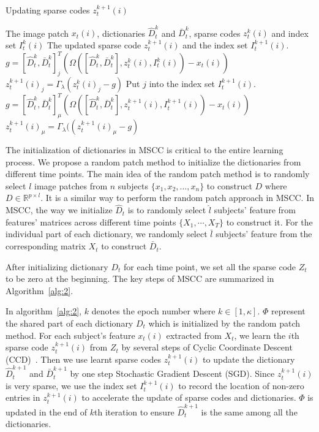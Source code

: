 \documentclass[10pt,twocolumn,letterpaper]{article}
\begin{document}
\begin{algorithm}[t]
\caption{Updating sparse codes $z_t^{k+1}(i)$}
\begin{algorithmic}[1]
   \Require The image patch $x_t(i)$, dictionaries $\hat{D}^k_t$ and $\bar{D}^k_t$, sparse codes $z_t^k(i)$ and index set $I_t^k(i)$
   \Ensure The updated sparse code $z_t^{k+1}(i)$ and the index set $I_t^{k+1}(i)$.
   \State\quad $g = [\hat{D}^k_t,\bar{D}^k_t]_j^T (  \Omega( [ \hat{D}^k_t, \bar{D}^k_t],  z_t^k(i), I_t^k(i) ) -x_t(i) ) $
   \State\quad $ z_t^{k+1}(i)_j=\Gamma_{\lambda }( z_t^k(i)_j-g) $
   \State\quad  Put $j$ into the index set $I_t^{k+1}(i)$.
   \EndIf
   \EndFor
   \State\quad $g = [\hat{D}^k_t,\bar{D}^k_t]_{\mu}^T( \Omega( [ \hat{D}^k_t, \bar{D}^k_t], z_t^{k+1}(i), I_t^{k+1}(i) )-x_t(i))$
   \State\quad $ z_t^{k+1}(i)_{\mu}=\Gamma_{\lambda }(( z_t^{k+1}(i)_{\mu}-g) $
   \EndFor
   \EndFor
\end{algorithmic}
\label{alg:3}
\end{algorithm}

The initialization of dictionaries in MSCC is critical to the entire learning process. We propose a random patch method to initialize the dictionaries from different time points. The main idea of the random patch method is to randomly select $l$ image patches from $n$ subjects $\{x_1, x_2, ..., x_n\}$ to construct $D$ where $D\in \mathbb{R}^{p\times l}$. It is a similar way to perform the random patch approach in MSCC. In MSCC, the way we initialize $\hat{D}_t$ is to randomly select $\hat{l}$ subjects' feature from features' matrices across different time points $\{X_1,\cdots,X_T\}$ to construct it. For the individual part of each dictionary, we randomly select $\bar{l}$ subjects' feature from the corresponding matrix $X_t$ to construct $\bar{D}_t$.

After initializing dictionary $D_t$ for each time point, we set all the sparse code $Z_t$ to be zero at the beginning. The key steps of MSCC are summarized in Algorithm~\ref{alg:2}.

In algorithm~\ref{alg:2}, $k$ denotes the epoch number where $k\in[1,\kappa]$. $\Phi$ represent the shared part of each dictionary $D_t$ which is initialized by the random patch method. For each subject's feature $x_t(i)$ extracted from $X_t$, we learn the $i$th sparse code  $z_t^{k+1}(i)$ from $Z_t$ by several steps of Cyclic Coordinate Descent (CCD)~\cite{canutescu2003cyclic}. Then we use learnt sparse codes $z_t^{k+1}(i)$ to update the dictionary $\hat{D}^{k+1}_t$ and $\bar{D}^{k+1}_t$ by one step Stochastic Gradient Descent (SGD)\cite{zhang2004solving}. Since $z_t^{k+1}(i)$ is very sparse, we use the index set $I_t^{k+1}(i)$ to record the location of non-zero entries in $z_t^{k+1}(i)$ to accelerate the update of sparse codes and dictionaries. $\Phi$ is updated in the end of $k$th iteration to ensure $\hat{D}^{k+1}_t$ is the same among all the dictionaries.
\end{document}
